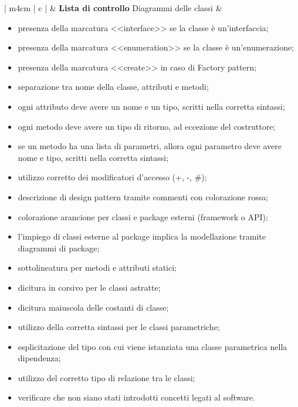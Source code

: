 	\begin{longtable}{| m{4cm} | c |}
	\hline
		\Gape[0.4cm][0.4cm]{\textbf{Diagramma}}
		&
		\textbf{Lista di controllo}
	\hline
		Diagrammi delle classi
		&
		\begin{minipage}[c]{0.7\textwidth}
			\vspace{0.2cm}
			\begin{itemize}
				\item presenza della marcatura \textless \textless interface\textgreater \textgreater {}  se la classe è un'interfaccia;
				\item presenza della marcatura \textless \textless enumeration\textgreater \textgreater {} se la classe è un'enumerazione;
				\item presenza della marcatura \textless \textless create\textgreater \textgreater {} in caso di Factory pattern;
				\item separazione tra nome della classe, attributi e metodi;
				\item ogni attributo deve avere un nome e un tipo, scritti nella corretta sintassi;
				\item ogni metodo deve avere un tipo di ritorno, ad eccezione del costruttore;
				\item se un metodo ha una lista di parametri, allora ogni parametro deve avere nome e tipo, scritti nella corretta sintassi;
				\item utilizzo corretto dei modificatori d'accesso (+, -, \#);
				\item descrizione di design pattern tramite commenti con colorazione rossa;
				\item colorazione arancione per classi e package esterni (framework o API);
				\item l'impiego di classi esterne al package implica la modellazione tramite diagrammi di package;
				\item sottolineatura per metodi e attributi statici;
				\item dicitura in corsivo per le classi astratte;
				\item dicitura maiuscola delle costanti di classe;
				\item utilizzo della corretta sintassi per le classi parametriche;
				\item esplicitazione del tipo con cui viene istanziata una classe parametrica nella dipendenza;
				\item utilizzo del corretto tipo di relazione tra le classi;
				\item verificare che non siano stati introdotti concetti legati al software.

\end{itemize}
\end{minipage}
\end{longtable}
